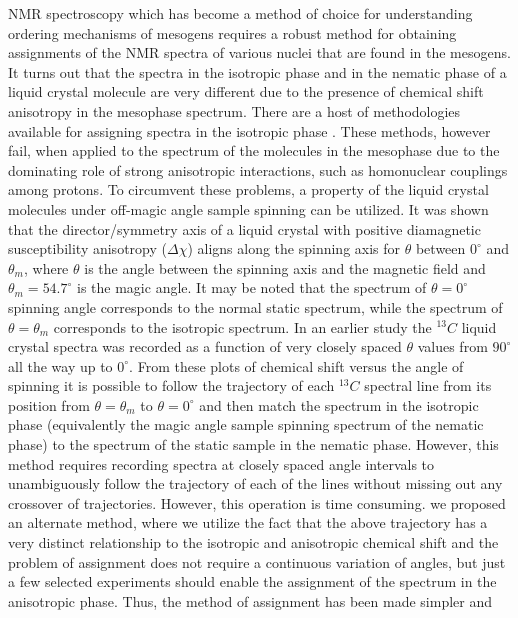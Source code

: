 NMR spectroscopy which has become a method of choice for understanding
ordering mechanisms of mesogens requires a robust method for obtaining
assignments of the NMR spectra of various nuclei that are found in the mesogens.
It turns out that the spectra in the isotropic phase and in the nematic phase of a
liquid crystal molecule are very different due to the presence of chemical shift
anisotropy in the mesophase spectrum. There are a host of methodologies
available for assigning spectra in the isotropic phase \cite{chap31-key4}. These methods, however
fail, when applied to the spectrum of the molecules in the mesophase due to the
dominating role of strong anisotropic interactions, such as homonuclear
couplings among protons. To circumvent these problems, a property of the liquid
crystal molecules under off-magic angle sample spinning can be utilized. It was
shown that the director/symmetry axis of a liquid crystal with positive
diamagnetic susceptibility anisotropy ($\Delta \chi$) aligns along the spinning axis for $\theta$
between $0^{\circ}$ and $\theta_m$, where $\theta$ is the angle between the spinning axis and the
magnetic field and $\theta_m = 54.7^{\circ}$ is the magic angle. It may be noted that the
spectrum of $\theta = 0^{\circ}$ spinning angle corresponds to the normal static spectrum,
while the spectrum of $\theta = \theta_m$ corresponds to the isotropic spectrum. In an earlier
study the ${}^{13}C$ liquid crystal spectra was recorded as a function of very closely
spaced $\theta$ values from $90^{\circ}$ all the way up to $0^{\circ}$. From these plots of chemical shift
versus the angle of spinning it is possible to follow the trajectory of each
${}^{13}C$ spectral line from its position from $\theta = \theta_m$ to $\theta = 0^\circ$ and then match the spectrum
in the isotropic phase (equivalently the magic angle sample spinning spectrum of
the nematic phase) to the spectrum of the static sample in the nematic phase.
However, this method requires recording spectra at closely spaced angle intervals
to unambiguously follow the trajectory of each of the lines without missing out
any crossover of trajectories. However, this operation is time consuming. we
proposed an alternate method, where we utilize the fact that the above trajectory
has a very distinct relationship to the isotropic and anisotropic chemical shift and
the problem of assignment does not require a continuous variation of angles, but
just a few selected experiments should enable the assignment of the spectrum in
the anisotropic phase. Thus, the method of assignment has been made simpler and
